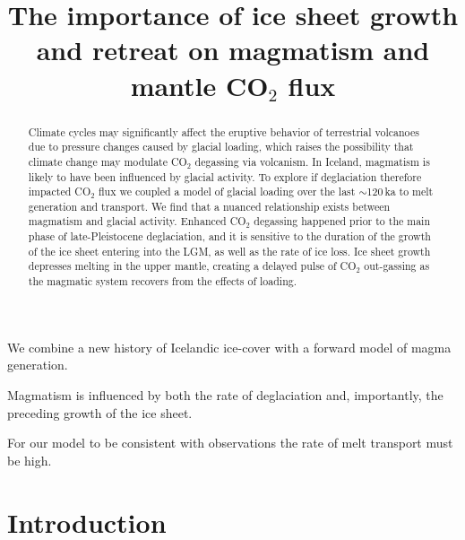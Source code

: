 \documentclass[draft,linenumbers]{agujournal2018}
\begin{document}
\title{The importance of ice sheet growth and retreat on magmatism and mantle CO$_2$ flux}





\begin{keypoints}
\item We combine a new history of Icelandic ice-cover with a forward model of magma generation.
\item Magmatism is influenced by both the rate of deglaciation and, importantly, the preceding growth of the ice sheet.
\item For our model to be consistent with observations the rate of melt transport must be high.
\end{keypoints}

\begin{abstract}
Climate cycles may significantly affect the eruptive behavior of terrestrial volcanoes due to pressure changes caused by glacial loading, which raises the possibility that climate change may modulate CO$_{2}$ degassing via volcanism. In Iceland, magmatism is likely to have been influenced by glacial activity. To explore if deglaciation therefore impacted CO$_{2}$ flux we coupled a model of glacial loading over the last $\sim$120\,ka to melt generation and transport. We find that a nuanced relationship exists between magmatism and glacial activity. Enhanced CO$_{2}$ degassing happened prior to the main phase of late-Pleistocene deglaciation, and it is sensitive to the duration of the growth of the ice sheet entering into the LGM, as well as the rate of ice loss. Ice sheet growth depresses melting in the upper mantle, creating a delayed pulse of CO$_{2}$ out-gassing as the magmatic system recovers from the effects of loading.
\end{abstract}

\section{Introduction}
\end{document}
